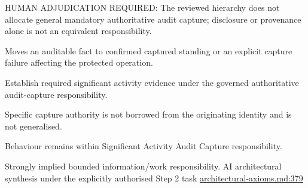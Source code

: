 HUMAN ADJUDICATION REQUIRED: The reviewed hierarchy does not allocate general mandatory authoritative audit capture; disclosure or provenance alone is not an equivalent responsibility.



Moves an auditable fact to confirmed captured standing or an explicit capture failure affecting the protected operation.



Establish required significant activity evidence under the governed authoritative audit-capture responsibility.



Specific capture authority is not borrowed from the originating identity and is not generalised.



Behaviour remains within Significant Activity Audit Capture responsibility.


Strongly implied bounded information/work responsibility. AI architectural synthesis under the explicitly authorised Step 2 task \hyperref[evidence:27549d51551beae6]{architectural-axioms.md:379}
